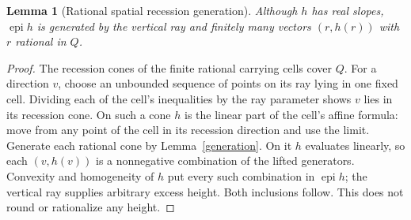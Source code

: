 \documentclass[11pt]{article}
\newtheorem{lemma}[theorem]{Lemma}
\theoremstyle{definition}\newtheorem{definition}[theorem]{Definition}
\theoremstyle{remark}\newtheorem{remark}[theorem]{Remark}
\newcommand{\epi}{\operatorname{epi}}\newcommand{\conv}{\operatorname{conv}}\newcommand{\cone}{\operatorname{cone}}
\begin{document}
\begin{lemma}[Rational spatial recession generation]\label{rays}
Although $h$ has real slopes, $\epi h$ is generated by the vertical ray and finitely many vectors $(r,h(r))$ with $r$ rational in $Q$.
\end{lemma}
\begin{proof}
The recession cones of the finite rational carrying cells cover $Q$. For a direction $v$, choose an unbounded sequence of points on its ray lying in one fixed cell. Dividing each of the cell's inequalities by the ray parameter shows $v$ lies in its recession cone. On such a cone $h$ is the linear part of the cell's affine formula: move from any point of the cell in its recession direction and use the limit. Generate each rational cone by Lemma~\ref{generation}. On it $h$ evaluates linearly, so each $(v,h(v))$ is a nonnegative combination of the lifted generators. Convexity and homogeneity of $h$ put every such combination in $\epi h$; the vertical ray supplies arbitrary excess height. Both inclusions follow. This does not round or rationalize any height.
\end{proof}
\end{document}
